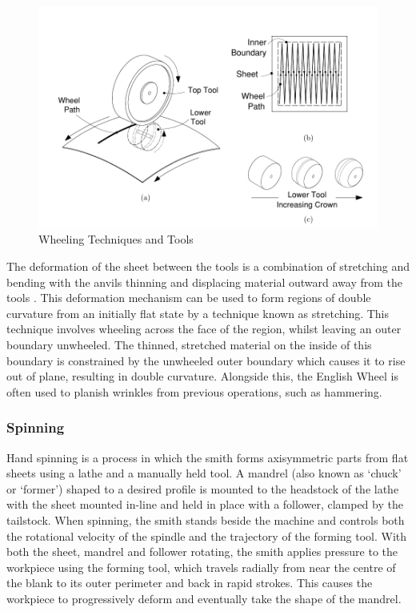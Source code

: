 \begin{figure}[h]
    \centering
    \includegraphics[width=0.8\linewidth]{Images/WheelingTechDrawing.pdf}
    \caption{Wheeling Techniques and Tools}
    \label{fig:WheelingTech}
\end{figure}


The deformation of the sheet between the tools is a combination of stretching and bending with the anvils thinning and displacing material outward away from the tools \citep{Bowen2021NumericalProcess}.  This deformation mechanism can be used to form regions of double curvature from an initially flat state by a technique known as stretching. This technique involves wheeling across the face of the region, whilst leaving an outer boundary unwheeled. The thinned, stretched material on the inside of this boundary is constrained by the unwheeled outer boundary which causes it to rise out of plane, resulting in double curvature. Alongside this, the English Wheel is often used to planish wrinkles from previous operations, such as hammering.

\subsubsection{Spinning} \label{sec:ManualSpinning}
Hand spinning is a process in which the smith forms axisymmetric parts from flat sheets using a lathe and a manually held tool. A mandrel (also known as `chuck’ or `former’) shaped to a desired profile is mounted to the headstock of the lathe with the sheet mounted in-line and held in place with a follower, clamped by the tailstock. When spinning, the smith stands beside the machine and controls both the rotational velocity of the spindle and the trajectory of the forming tool. With both the sheet, mandrel and follower rotating, the smith applies pressure to the workpiece using the forming tool, which travels radially from near the centre of the blank to its outer perimeter and back in rapid strokes. This causes the workpiece to progressively deform and eventually take the shape of the mandrel.

